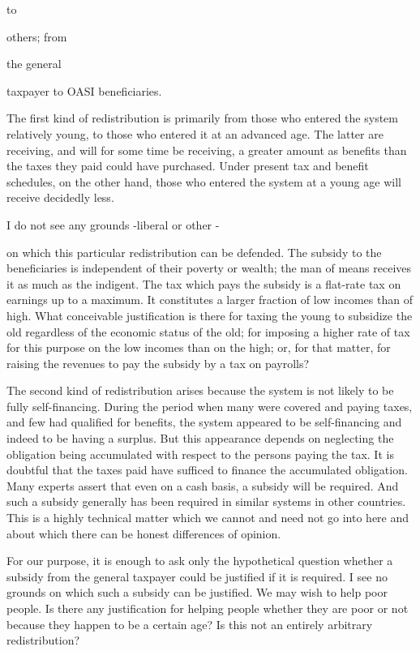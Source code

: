 \documentclass[11pt,openany]{book}
\begin{document}
to

others; from

the general

taxpayer to OASI beneficiaries.

The first kind of redistribution is primarily from those who entered the system relatively young, to those who entered it at an advanced age. The latter are receiving, and will for some time be receiving, a greater amount as benefits than the taxes they paid could have purchased. Under present tax and benefit schedules, on the other hand, those who entered the system at a young age will receive decidedly less.

I do not see any grounds -liberal or other -

on which this particular redistribution can be defended. The subsidy to the beneficiaries is independent of their poverty or wealth; the man of means receives it as much as the indigent. The tax which pays the subsidy is a flat-rate tax on earnings up to a maximum. It constitutes a larger fraction of low incomes than of high. What conceivable justification is there for taxing the young to subsidize the old regardless of the economic status of the old; for imposing a higher rate of tax for this purpose on the low incomes than on the high; or, for that matter, for raising the revenues to pay the subsidy by a tax on payrolls?

The second kind of redistribution arises because the system is not likely to be fully self-financing. During the period when many were covered and paying taxes, and few had qualified for benefits, the system appeared to be self-financing and indeed to be having a surplus. But this appearance depends on neglecting the obligation being accumulated with respect to the persons paying the tax. It is doubtful that the taxes paid have sufficed to finance the accumulated obligation. Many experts assert that even on a cash basis, a subsidy will be required. And such a subsidy generally has been required in similar systems in other countries. This is a highly technical matter which we cannot and need not go into here and about which there can be honest differences of opinion.

For our purpose, it is enough to ask only the hypothetical question whether a subsidy from the general taxpayer could be justified if it is required. I see no grounds on which such a subsidy can be justified. We may wish to help poor people. Is there any justification for helping people whether they are poor or not because they happen to be a certain age? Is this not an entirely arbitrary redistribution?
\end{document}
